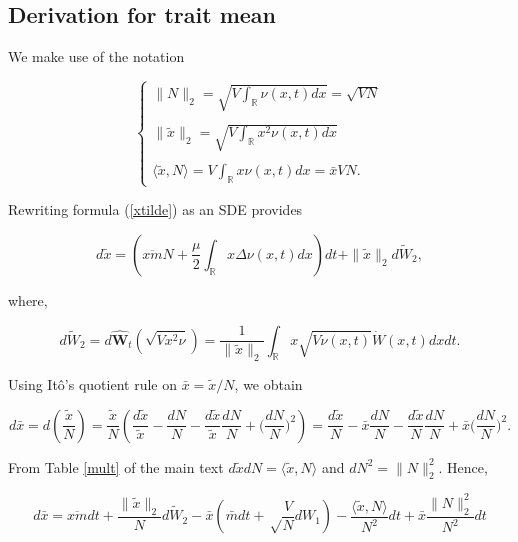 \documentclass[]{article}
\begin{document}
\hypertarget{derivation-for-trait-mean}{%
\subsection{Derivation for trait mean}\label{derivation-for-trait-mean}}

We make use of the notation

\begin{equation}
\left\{\begin{matrix}
\|N\|_2 = \sqrt{V\int_\mathbb{R}\nu(x,t)dx}= \sqrt{VN} \\ \\
\|\tilde x\|_2 = \sqrt{V\int_\mathbb{R}x^2\nu(x,t)dx} \\ \\
\langle\tilde x,N\rangle = V\int_\mathbb{R}x\nu(x,t)dx=\bar x VN.
\end{matrix}\right.
\end{equation}

Rewriting formula (\ref{xtilde}) as an SDE provides

\begin{equation}
d\tilde x=\left(\overline{xm}N+\frac{\mu}{2}\int_\mathbb{R}x\Delta\nu(x,t)dx\right)dt+\|\tilde x\|_2d\tilde W_2,
\end{equation}

where,

\begin{equation}
d\tilde{ W}_2=d\hat{\mathbf W}_t(\sqrt{V x^2\nu})=\frac{1}{\|\tilde x\|_2}\int_\mathbb{R}x\sqrt{V\nu(x,t)}\dot W(x,t)dxdt.
\end{equation}

Using Itô's quotient rule on \(\bar x=\tilde x/N\), we obtain

\begin{equation}
d\bar x = d\left(\frac{\tilde x}{N}\right)=\frac{\tilde x}{N}\left(\frac{d\tilde x}{\tilde x}-\frac{dN}{N}-\frac{d\tilde x}{\tilde x}\frac{dN}{N}+\Big(\frac{dN}{N}\Big)^2\right)
= \frac{d\tilde x}{N}-\bar x\frac{dN}{N}-\frac{d\tilde x}{N}\frac{dN}{N}+\bar x\Big(\frac{dN}{N}\Big)^2.
\end{equation}

From Table \ref{mult} of the main text
\(d\tilde xdN=\langle\tilde x,N\rangle\) and \(dN^2=\|N\|_2^2\). Hence,

\begin{equation}
d\bar x= \overline{xm}dt+\frac{\|\tilde x\|_2}{N}d\tilde W_2-\bar x\left(\bar m dt+\sqrt\frac{V}{N}dW_1\right)-\frac{\langle\tilde x,N\rangle}{N^2}dt+\bar x\frac{\|N\|_2^2}{N^2}dt
\end{equation}
\end{document}
